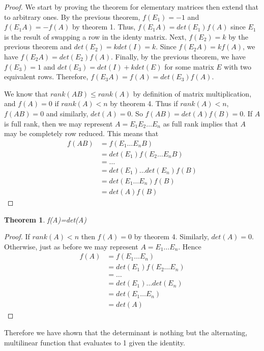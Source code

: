\documentclass{article}
\newtheorem{thm}{Theorem}
\begin{document}
\begin{proof}
We start by proving the theorem for elementary matrices then extend that to arbitrary ones. 
By the previous theorem, $f(E_1)=-1$ and $f(E_1A)=-f(A)$ by theorem 1. Thus, $f(E_1A)=det(E_1)f(A)$ since $E_1$ is the result of swapping a row in the identy matrix. Next, $f(E_2)=k$ by the previous theorem and $det(E_2)=kdet(I)=k$. Since $f(E_2A)=kf(A)$, we have $f(E_2A)=det(E_2)f(A)$. Finally, by the previous theorem, we have $f(E_3)=1$ and $det(E_3)=det(I)+kdet(E)$ for some matrix $E$ with two equivalent rows. Therefore, $f(E_3A)=f(A)=det(E_3)f(A)$.

	We know that $rank(AB)\leq rank(A)$ by definition of matrix multiplication, and $f(A)=0 \text{ if } rank(A)<n$ by theorem 4. Thus if $rank(A)<n$, 
$f(AB)=0$ and similarly, $det(A)=0$. So $f(AB)=det(A)f(B)=0$. 
If $A$ is full rank, then we may represent $A=E_1E_2\dots E_n$ as full rank implies that $A$ may be completely row reduced. This means that 
\begin{align}
f(AB)&=f(E_1\dots E_nB) \\ 
&=det(E_1)f(E_2\dots E_nB) \\ 
&= \dots \\
&=det(E_1)\dots det(E_n)f(B) \\ 
&=det(E_1\dots E_n)f(B) \\ 
&=det(A)f(B)
\end{align}
\end{proof}
\begin{thm}
f(A)=det(A)	
\end{thm}
\begin{proof}
If $rank(A)<n$ then $f(A)=0$ by theorem 4. Similarly, $det(A)=0$. 
Otherwise, just as before we may represent $A=E_1 \dots E_n$. Hence  
\begin{align}
f(A)&=f(E_1\dots E_n) \\
&=det(E_1)f(E_2 \dots E_n) \\
&= \dots \\ 
&=det(E_1)\dots det(E_n) \\ 
&=det(E_1\dots E_n) \\
&=det(A)
\end{align}
\end{proof}
Therefore we have shown that the determinant is nothing but the alternating, multilinear function that evaluates to 1 given the identity.
\end{document}
